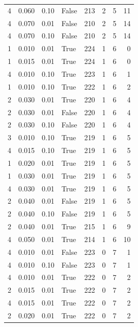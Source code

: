 \documentclass[a4paper,twoside,12pt]{book}
\begin{document}
\begin{table}
\begin{tabular}{rrrlrrrr}
				4 &  0.060 &     0.10 &    False &  213 &  2 &   5 &  11 \\
				4 &  0.070 &     0.01 &    False &  210 &  2 &   5 &  14 \\
				4 &  0.070 &     0.10 &    False &  210 &  2 &   5 &  14 \\
				1 &  0.010 &     0.01 &     True &  224 &  1 &   6 &   0 \\
				1 &  0.015 &     0.01 &     True &  224 &  1 &   6 &   0 \\
				4 &  0.010 &     0.10 &     True &  223 &  1 &   6 &   1 \\
				1 &  0.010 &     0.10 &     True &  222 &  1 &   6 &   2 \\
				2 &  0.030 &     0.01 &     True &  220 &  1 &   6 &   4 \\
				2 &  0.030 &     0.01 &    False &  220 &  1 &   6 &   4 \\
				2 &  0.030 &     0.10 &    False &  220 &  1 &   6 &   4 \\
				3 &  0.010 &     0.10 &     True &  219 &  1 &   6 &   5 \\
				4 &  0.015 &     0.10 &     True &  219 &  1 &   6 &   5 \\
				1 &  0.020 &     0.01 &     True &  219 &  1 &   6 &   5 \\
				1 &  0.030 &     0.01 &     True &  219 &  1 &   6 &   5 \\
				4 &  0.030 &     0.01 &     True &  219 &  1 &   6 &   5 \\
				2 &  0.040 &     0.01 &    False &  219 &  1 &   6 &   5 \\
				2 &  0.040 &     0.10 &    False &  219 &  1 &   6 &   5 \\
				2 &  0.040 &     0.01 &     True &  215 &  1 &   6 &   9 \\
				4 &  0.050 &     0.01 &     True &  214 &  1 &   6 &  10 \\
				4 &  0.010 &     0.01 &    False &  223 &  0 &   7 &   1 \\
				4 &  0.010 &     0.10 &    False &  223 &  0 &   7 &   1 \\
				4 &  0.010 &     0.01 &     True &  222 &  0 &   7 &   2 \\
				2 &  0.015 &     0.01 &     True &  222 &  0 &   7 &   2 \\
				4 &  0.015 &     0.01 &     True &  222 &  0 &   7 &   2 \\
				2 &  0.020 &     0.01 &     True &  222 &  0 &   7 &   2 \\

\end{tabular}
\end{table}
\end{document}
